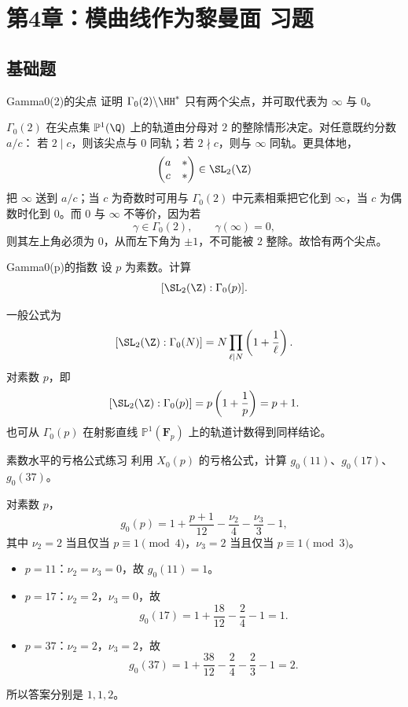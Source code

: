 \chapter{第4章：模曲线作为黎曼面 习题}
\difficultykey

\section{基础题 \easy}

\begin{problem}{Gamma0(2)的尖点}
证明 $\Gamma_0(2)\backslash\HH^*$ 只有两个尖点，并可取代表为 $\infty$ 与 $0$。
\end{problem}
\begin{solution}
$\Gamma_0(2)$ 在尖点集 $\mathbb{P}^1(\Q)$ 上的轨道由分母对 $2$ 的整除情形决定。对任意既约分数 $a/c$：
若 $2\mid c$，则该尖点与 $0$ 同轨；若 $2\nmid c$，则与 $\infty$ 同轨。更具体地，
\[
\begin{pmatrix}a&*\\c&*\end{pmatrix}\in\SL_2(\Z)
\]
把 $\infty$ 送到 $a/c$；当 $c$ 为奇数时可用与 $\Gamma_0(2)$ 中元素相乘把它化到 $\infty$，当 $c$ 为偶数时化到 $0$。而 $0$ 与 $\infty$ 不等价，因为若
\[
\gamma\in\Gamma_0(2),\qquad \gamma(\infty)=0,
\]
则其左上角必须为 $0$，从而左下角为 $\pm1$，不可能被 $2$ 整除。故恰有两个尖点。
\end{solution}

\begin{problem}{Gamma0(p)的指数}
设 $p$ 为素数。计算
\[
[\SL_2(\Z):\Gamma_0(p)].
\]
\end{problem}
\begin{solution}
一般公式为
\[
[\SL_2(\Z):\Gamma_0(N)]=N\prod_{\ell\mid N}\left(1+\frac1\ell\right).
\]
对素数 $p$，即
\[
[\SL_2(\Z):\Gamma_0(p)]=p\left(1+\frac1p\right)=p+1.
\]
也可从 $\Gamma_0(p)$ 在射影直线 $\mathbb{P}^1(\mathbf{F}_p)$ 上的轨道计数得到同样结论。
\end{solution}

\begin{problem}{素数水平的亏格公式练习}
利用 $X_0(p)$ 的亏格公式，计算 $g_0(11)$、$g_0(17)$、$g_0(37)$。
\end{problem}
\begin{solution}
对素数 $p$，
\[
g_0(p)=1+\frac{p+1}{12}-\frac{\nu_2}{4}-\frac{\nu_3}{3}-1,
\]
其中 $\nu_2=2$ 当且仅当 $p\equiv1\pmod4$，$\nu_3=2$ 当且仅当 $p\equiv1\pmod3$。

\begin{itemize}
\item $p=11$：$\nu_2=\nu_3=0$，故 $g_0(11)=1$。
\item $p=17$：$\nu_2=2$，$\nu_3=0$，故
\[
g_0(17)=1+\frac{18}{12}-\frac24-1=1.
\]
\item $p=37$：$\nu_2=2$，$\nu_3=2$，故
\[
g_0(37)=1+\frac{38}{12}-\frac24-\frac23-1=2.
\]
\end{itemize}
所以答案分别是 $1,1,2$。
\end{solution}

